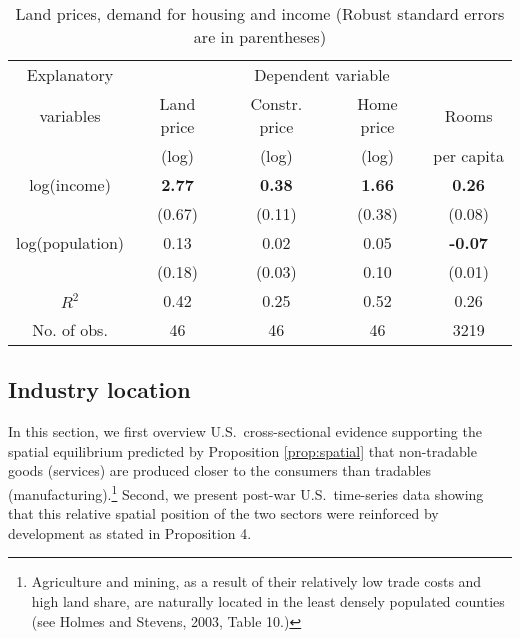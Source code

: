 \documentclass[12pt]{article}
\begin{document}
\begin{table}[h!]
\center \caption{Land prices, demand for housing and income (Robust standard errors are in parentheses)} \label{tab:land}
\begin{tabular}{c|ccc|c}
  \hline\hline
  Explanatory    & \multicolumn{4}{c}{Dependent variable} \\
  variables      & Land price  & Constr. price & Home price&Rooms\\
                 &  (log)      &    (log)      & (log)     & per capita \\ \hline
  log(income)    & \textbf{2.77}   & \textbf{0.38}  & \textbf{1.66} & \textbf{0.26}\\
                 & (0.67)          & (0.11)         &  (0.38) & (0.08)\\
  log(population)& 0.13            &  0.02          &  0.05   & \textbf{-0.07}\\
                 & (0.18)          & (0.03)         &  0.10   & (0.01)\\
\hline
  $R^2$          & 0.42            & 0.25           &   0.52  & 0.26\\
  No. of obs.    & 46              & 46             &   46    & 3219 \\ \hline\hline
\end{tabular}
\end{table}

\subsection{Industry location}
In this section, we first overview U.S.~cross-sectional evidence supporting the spatial equilibrium predicted by Proposition \ref{prop:spatial} that non-tradable goods (services) are produced closer to the consumers than tradables (manufacturing).\footnote{Agriculture and mining, as a result of their relatively low trade costs and high land share, are naturally located in the least densely populated counties (see Holmes and Stevens, 2003, Table 10.)} Second, we present post-war U.S.~time-series data showing that this relative spatial position of the two sectors were reinforced by development as stated in Proposition 4.
\end{document}
